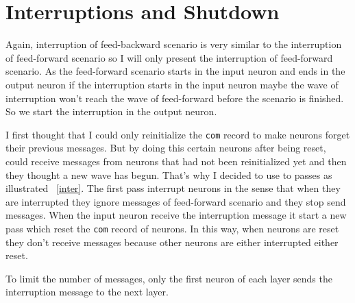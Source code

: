 \documentclass[12pt]{article}
\begin{document}
\section{Interruptions and Shutdown}

Again, interruption of feed-backward scenario is very similar to the interruption of feed-forward scenario so I will only present the interruption of feed-forward scenario. As the feed-forward scenario starts in the input neuron and ends in the output neuron if the interruption starts in the input neuron maybe the wave of interruption won't reach the wave of feed-forward before the scenario is finished. So we start the interruption in the output neuron.

I first thought that I could only reinitialize the \verb|com| record to make neurons forget their previous messages. But by doing this certain neurons after being reset, could receive messages from neurons that had not been reinitialized yet and then they thought a new wave has begun. That's why I decided to use to passes as illustrated \figurename~\ref{inter}. The first pass interrupt neurons in the sense that when they are interrupted they ignore messages of feed-forward scenario and they stop send messages. When the input neuron receive the interruption message it start a new pass which reset the \verb|com| record of neurons. In this way, when neurons are reset they don't receive messages because other neurons are either interrupted either reset.

To limit the number of messages, only the first neuron of each layer sends the interruption message to the next layer.
\end{document}
